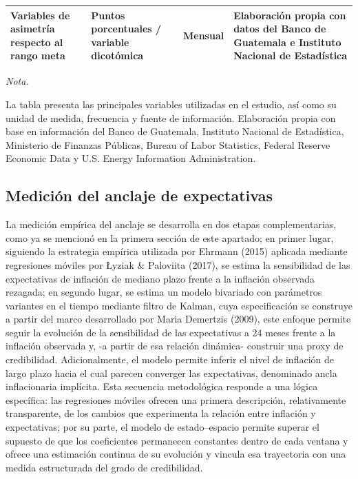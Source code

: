 \documentclass[
  10.5pt,
  letterpaper,
  twocolumn]{article}
\begin{document}
\begin{landscape}
\begin{table}
\begin{threeparttable}
\begin{tabular}[t]{>{\raggedright\arraybackslash}p{7.5cm}>{\raggedright\arraybackslash}p{4.5cm}>{\raggedright\arraybackslash}p{3.5cm}>{\raggedright\arraybackslash}p{8.5cm}}
Variables de asimetría respecto al rango meta & Puntos porcentuales / variable dicotómica & Mensual & Elaboración propia con datos del Banco de Guatemala e Instituto Nacional de Estadística\\
\bottomrule
\end{tabular}
\begin{tablenotes}[para]
\item \textit{Nota. } 
\item La tabla presenta las principales variables utilizadas en el estudio, así como su unidad de medida, frecuencia y fuente de información. Elaboración propia con base en información del Banco de Guatemala, Instituto Nacional de Estadística, Ministerio de Finanzas Públicas, Bureau of Labor Statistics, Federal Reserve Economic Data y U.S. Energy Information Administration.
\end{tablenotes}
\end{threeparttable}
\end{table}
\end{landscape}
\clearpage
\twocolumn

\subsection{Medición del anclaje de
expectativas}\label{mediciuxf3n-del-anclaje-de-expectativas}

La medición empírica del anclaje se desarrolla en dos etapas
complementarias, como ya se mencionó en la primera sección de este
apartado; en primer lugar, siguiendo la estrategia empírica utilizada
por Ehrmann (2015) aplicada mediante regresiones móviles por Łyziak \&
Paloviita (2017), se estima la sensibilidad de las expectativas de
inflación de mediano plazo frente a la inflación observada rezagada; en
segundo lugar, se estima un modelo bivariado con parámetros variantes en
el tiempo mediante filtro de Kalman, cuya especificación se construye a
partir del marco desarrollado por Maria Demertzis (2009), este enfoque
permite seguir la evolución de la sensibilidad de las expectativas a 24
meses frente a la inflación observada y, -a partir de esa relación
dinámica- construir una proxy de credibilidad. Adicionalmente, el modelo
permite inferir el nivel de inflación de largo plazo hacia el cual
parecen converger las expectativas, denominado ancla inflacionaria
implícita. Esta secuencia metodológica responde a una lógica específica:
las regresiones móviles ofrecen una primera descripción, relativamente
transparente, de los cambios que experimenta la relación entre inflación
y expectativas; por su parte, el modelo de estado--espacio permite
superar el supuesto de que los coeficientes permanecen constantes dentro
de cada ventana y ofrece una estimación continua de su evolución y
vincula esa trayectoria con una medida estructurada del grado de
credibilidad.
\end{document}
